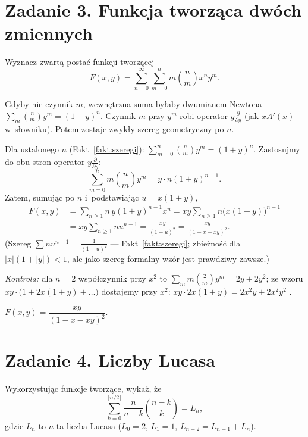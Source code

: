 \documentclass[11pt]{article}
\begin{document}
\section{Zadanie 3. Funkcja tworząca dwóch zmiennych}
\begin{tresc}
Wyznacz zwartą postać funkcji tworzącej
\[
F(x,y)=\sum_{n=0}^{\infty}\sum_{m=0}^{n}m\binom nm x^ny^m.
\]
\end{tresc}

\begin{intuicja}
Gdyby nie czynnik $m$, wewnętrzna suma byłaby dwumianem Newtona
$\sum_m\binom nmy^m=(1+y)^n$. Czynnik $m$ przy $y^m$ robi operator
$y\frac{\partial}{\partial y}$ (jak $xA'(x)$ w~słowniku). Potem zostaje zwykły
szereg geometryczny po $n$.
\end{intuicja}

\formalnie
Dla ustalonego $n$ (Fakt~\ref{fakt:szeregi}): $\sum_{m=0}^n\binom nmy^m=(1+y)^n$.
Zastosujmy do obu stron operator $y\frac{\partial}{\partial y}$:
\[
\sum_{m=0}^nm\binom nmy^m=y\cdot n(1+y)^{n-1}.
\]
Zatem, sumując po $n$ i~podstawiając $u=x(1+y)$,
\begin{align*}
F(x,y)&=\sum_{n\ge1}n\,y(1+y)^{n-1}x^n
=xy\sum_{n\ge1}n\bigl(x(1+y)\bigr)^{n-1}\\
&=xy\sum_{n\ge1}nu^{n-1}=\frac{xy}{(1-u)^2}
=\frac{xy}{(1-x-xy)^2}.
\end{align*}
(Szereg $\sum nu^{n-1}=\frac1{(1-u)^2}$ --- Fakt~\ref{fakt:szeregi}; zbieżność dla $|x|(1+|y|)<1$, ale jako
szereg formalny wzór jest prawdziwy zawsze.)

\emph{Kontrola:} dla $n=2$ współczynnik przy $x^2$ to
$\sum_m m\binom2my^m=2y+2y^2$; ze wzoru
$xy\cdot\bigl(1+2x(1+y)+\dots\bigr)$ dostajemy przy $x^2$: $xy\cdot2x(1+y)
=2x^2y+2x^2y^2$ \checkmark.
\begin{odpowiedz}
$F(x,y)=\dfrac{xy}{(1-x-xy)^2}$.
\end{odpowiedz}

\section{Zadanie 4. Liczby Lucasa}
\begin{tresc}
Wykorzystując funkcje tworzące, wykaż, że
\[
\sum_{k=0}^{\lfloor n/2\rfloor}\frac{n}{n-k}\binom{n-k}{k}=L_n,
\]
gdzie $L_n$ to $n$-ta liczba Lucasa ($L_0=2$, $L_1=1$,
$L_{n+2}=L_{n+1}+L_n$).
\end{tresc}
\end{document}

